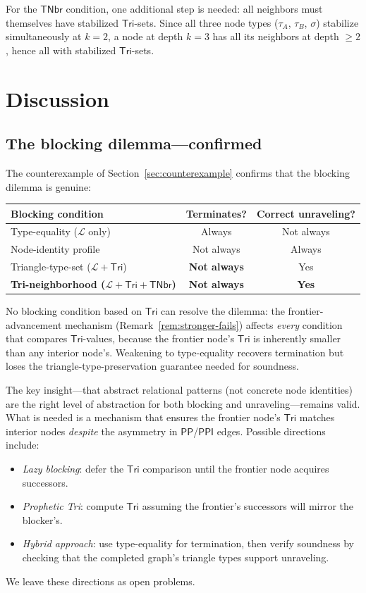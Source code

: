 \documentclass[a4paper,11pt]{article}
\theoremstyle{definition}
\newcommand{\PP}{\ensuremath{\mathsf{PP}}}
\newcommand{\PPI}{\ensuremath{\mathsf{PPI}}}
\newcommand{\Tri}{\ensuremath{\mathsf{Tri}}}
\newcommand{\TNbr}{\ensuremath{\mathsf{TNbr}}}
\newcommand{\LL}{\ensuremath{\mathcal{L}}}
\begin{document}
For the $\TNbr$ condition, one additional step is needed:
all neighbors must themselves have stabilized $\Tri$-sets.
Since all three node types ($\tau_A$, $\tau_B$, $\sigma$)
stabilize simultaneously at $k = 2$, a node at depth
$k = 3$ has all its neighbors at depth $\ge 2$, hence
all with stabilized $\Tri$-sets.


\section{Discussion}\label{sec:discussion}

\subsection{The blocking dilemma---confirmed}

The counterexample of Section~\ref{sec:counterexample}
confirms that the blocking dilemma is genuine:

\begin{center}
\begin{tabular}{lcc}
\toprule
Blocking condition & Terminates? & Correct unraveling? \\
\midrule
Type-equality ($\LL$ only) & Always & Not always \\
Node-identity profile & Not always & Always \\
Triangle-type-set ($\LL + \Tri$) & \textbf{Not always} & Yes \\
\textbf{Tri-neighborhood ($\LL + \Tri + \TNbr$)}
  & \textbf{Not always} & \textbf{Yes} \\
\bottomrule
\end{tabular}
\end{center}

No blocking condition based on $\Tri$ can resolve the
dilemma: the frontier-advancement mechanism
(Remark~\ref{rem:stronger-fails}) affects \emph{every}
condition that compares $\Tri$-values, because the frontier
node's $\Tri$ is inherently smaller than any interior node's.
Weakening to type-equality recovers termination but loses
the triangle-type-preservation guarantee needed for soundness.

The key insight---that abstract relational patterns (not
concrete node identities) are the right level of abstraction
for both blocking and unraveling---remains valid.  What is
needed is a mechanism that ensures the frontier node's $\Tri$
matches interior nodes \emph{despite} the asymmetry in
$\PP$/$\PPI$ edges.  Possible directions include:
\begin{itemize}[nosep]
  \item \emph{Lazy blocking}: defer the $\Tri$ comparison
    until the frontier node acquires successors.
  \item \emph{Prophetic Tri}: compute $\Tri$ assuming
    the frontier's successors will mirror the blocker's.
  \item \emph{Hybrid approach}: use type-equality for
    termination, then verify soundness by checking that
    the completed graph's triangle types support unraveling.
\end{itemize}
We leave these directions as open problems.
\end{document}

